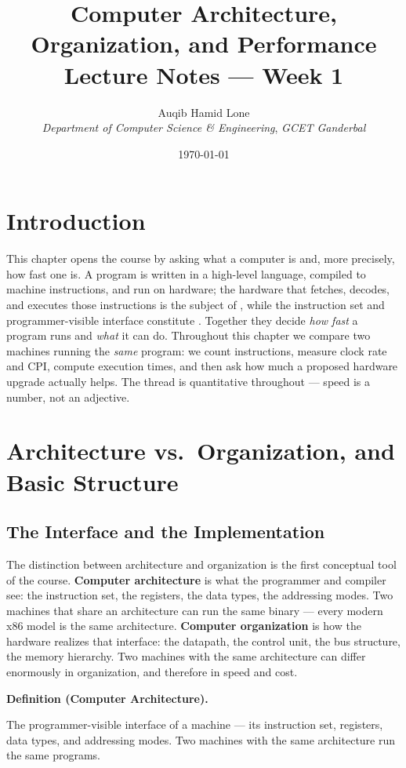 \documentclass[11pt]{article}
\title{Computer Architecture, Organization, and Performance\\\large Lecture Notes --- Week 1}
\author{Auqib Hamid Lone\\[0.3em]
  \emph{Department of Computer Science \& Engineering}, \emph{GCET Ganderbal}}
\date{\today}
\newenvironment{definitionbox}[1]{%
  \par\noindent\textbf{Definition (#1).}\ \itshape
}{\par\vspace{0.3em}}
\begin{document}
\maketitle

\section{Introduction}

This chapter opens the course by asking what a computer is and, more precisely, how fast one is. A program is written in a high-level language, compiled to machine instructions, and run on hardware; the hardware that fetches, decodes, and executes those instructions is the subject of , while the instruction set and programmer-visible interface constitute . Together they decide \emph{how fast} a program runs and \emph{what} it can do. Throughout this chapter we compare two machines running the \emph{same} program: we count instructions, measure clock rate and CPI, compute execution times, and then ask how much a proposed hardware upgrade actually helps. The thread is quantitative throughout --- speed is a number, not an adjective.

\section{Architecture vs.\ Organization, and Basic Structure}

\subsection{The Interface and the Implementation}

The distinction between architecture and organization is the first conceptual tool of the course. \textbf{Computer architecture} is what the programmer and compiler see: the instruction set, the registers, the data types, the addressing modes. Two machines that share an architecture can run the same binary --- every modern x86 model is the same architecture. \textbf{Computer organization} is how the hardware realizes that interface: the datapath, the control unit, the bus structure, the memory hierarchy. Two machines with the same architecture can differ enormously in organization, and therefore in speed and cost.

\begin{definitionbox}{Computer Architecture}
The programmer-visible interface of a machine --- its instruction set, registers, data types, and addressing modes. Two machines with the same architecture run the same programs.
\end{definitionbox}
\end{document}
